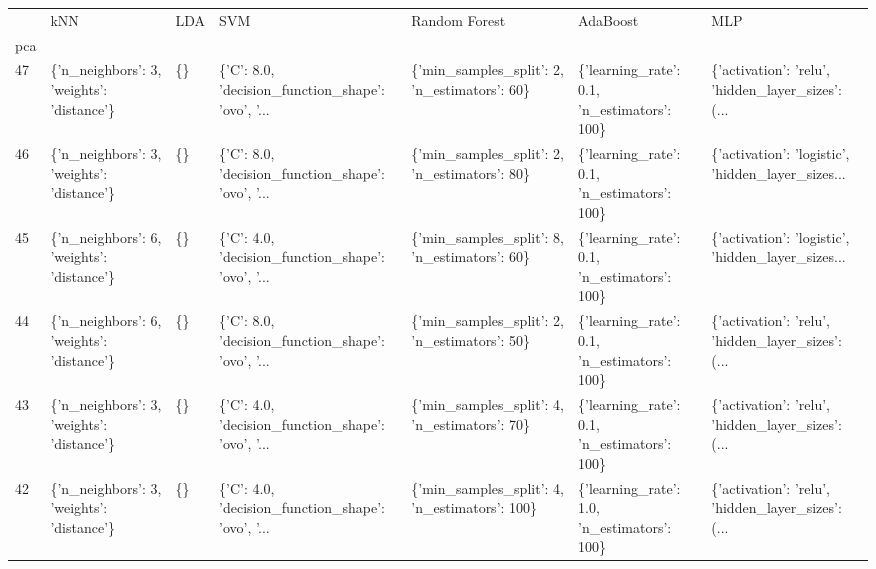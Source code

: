 \begin{tabular}{lllllll}
\toprule
{} &                                        kNN & LDA &                                                SVM &                                  Random Forest &                                     AdaBoost &                                                MLP \\
pca &                                            &     &                                                    &                                                &                                              &                                                    \\
\midrule
47  &  \{'n\_neighbors': 3, 'weights': 'distance'\} &  \{\} &  \{'C': 8.0, 'decision\_function\_shape': 'ovo', '... &   \{'min\_samples\_split': 2, 'n\_estimators': 60\} &  \{'learning\_rate': 0.1, 'n\_estimators': 100\} &  \{'activation': 'relu', 'hidden\_layer\_sizes': (... \\
46  &  \{'n\_neighbors': 3, 'weights': 'distance'\} &  \{\} &  \{'C': 8.0, 'decision\_function\_shape': 'ovo', '... &   \{'min\_samples\_split': 2, 'n\_estimators': 80\} &  \{'learning\_rate': 0.1, 'n\_estimators': 100\} &  \{'activation': 'logistic', 'hidden\_layer\_sizes... \\
45  &  \{'n\_neighbors': 6, 'weights': 'distance'\} &  \{\} &  \{'C': 4.0, 'decision\_function\_shape': 'ovo', '... &   \{'min\_samples\_split': 8, 'n\_estimators': 60\} &  \{'learning\_rate': 0.1, 'n\_estimators': 100\} &  \{'activation': 'logistic', 'hidden\_layer\_sizes... \\
44  &  \{'n\_neighbors': 6, 'weights': 'distance'\} &  \{\} &  \{'C': 8.0, 'decision\_function\_shape': 'ovo', '... &   \{'min\_samples\_split': 2, 'n\_estimators': 50\} &  \{'learning\_rate': 0.1, 'n\_estimators': 100\} &  \{'activation': 'relu', 'hidden\_layer\_sizes': (... \\
43  &  \{'n\_neighbors': 3, 'weights': 'distance'\} &  \{\} &  \{'C': 4.0, 'decision\_function\_shape': 'ovo', '... &   \{'min\_samples\_split': 4, 'n\_estimators': 70\} &  \{'learning\_rate': 0.1, 'n\_estimators': 100\} &  \{'activation': 'relu', 'hidden\_layer\_sizes': (... \\
42  &  \{'n\_neighbors': 3, 'weights': 'distance'\} &  \{\} &  \{'C': 4.0, 'decision\_function\_shape': 'ovo', '... &  \{'min\_samples\_split': 4, 'n\_estimators': 100\} &  \{'learning\_rate': 1.0, 'n\_estimators': 100\} &  \{'activation': 'relu', 'hidden\_layer\_sizes': (... \\

\end{tabular}
